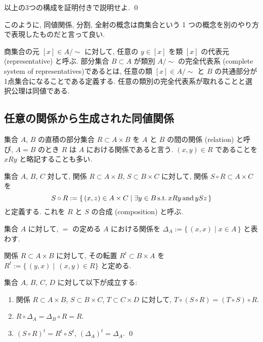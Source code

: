 \documentclass[12pt,twoside]{jarticle}
\def\suchthat{\mathop{\text{\rm s.t.}}}
\def\AND{\mathop{\text{\rm and}}}
\begin{document}
\begin{question}
  以上の3つの構成を証明付きで説明せよ. \qed
\end{question}

このように, 同値関係, 分割, 全射の概念は商集合という 1 つの概念を別のやり方
で表現したものだと言って良い.

商集合の元 $[x]\in A/{\sim}$ に対して, 任意の $y\in[x]$ を類 $[x]$ の代表元 
(representative) と呼ぶ. 
部分集合 $B\subset A$ が類別 $A/{\sim}$ の完全代表系 (complete system of
representatives)であるとは, 任意の類 $[x]\in A/{\sim}$ と $B$ の共通部分が
1点集合になることである定義する.
任意の類別の完全代表系が取れることと選択公理は同値である.


\subsection{任意の関係から生成された同値関係}
\label{ss:gen-equiv-rel}



集合 $A$, $B$ の直積の部分集合 $R\subset A\times B$ を $A$ と $B$ の間の関係
(relation) と呼び, $A=B$ のとき $R$ は $A$ における関係であると言う.
$(x,y)\in R$ であることを $xRy$ と略記することも多い.

集合 $A$, $B$, $C$ 対して,
関係 $R\subset A\times B$, $S\subset B\times C$ に対して, 
関係 $S\circ R\subset A\times C$ を
\begin{equation*}
  S\circ R :=
  \{\,(x,z)\in A\times C \mid \exists y\in B \suchthat xRy \AND ySz \,\}
\end{equation*}
と定義する. これを $R$ と $S$ の合成 (composition) と呼ぶ.

集合 $A$ に対して, $=$ の定める $A$ における関係を %
$\Delta_A := \{\,(x,x)\mid x\in A\,\}$ と表わす. 

関係 $R\subset A\times B$ に対して, 
その転置 $R^t\subset B\times A$ を %
$R^t:=\{\,(y,x)\mid\,(x,y)\in R\}$ と定める.

\begin{question}
  集合 $A$, $B$, $C$, $D$ に対して以下が成立する:
  \begin{enumerate}
  \item 関係 $R\subset A\times B$, $S\subset B\times C$,
    $T\subset C\times D$ に対して, 
    $T\circ(S\circ R) = (T\circ S)\circ R$.
  \item $R\circ\Delta_A = \Delta_B\circ R = R$. 
  \item $(S\circ R)^t = R^t\circ S^t$, \quad $(\Delta_A)^t = \Delta_A$.
    \qed
  \end{enumerate}
\end{question}
\end{document}
